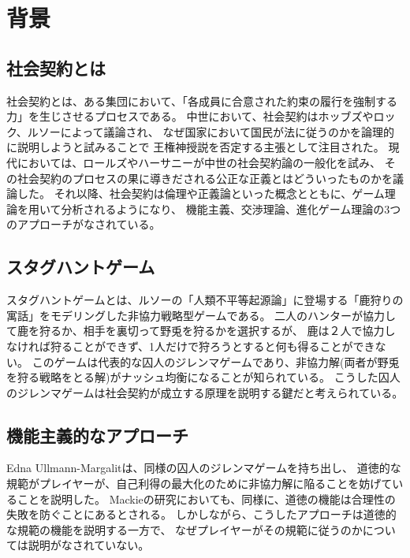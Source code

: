 

\chapter{背景}
\section{社会契約とは}
社会契約とは、ある集団において、「各成員に合意された約束の履行を強制する力」を生じさせるプロセスである。
中世において、社会契約はホッブズやロック、ルソーによって議論され、
なぜ国家において国民が法に従うのかを論理的に説明しようと試みることで
王権神授説を否定する主張として注目された。
現代においては、ロールズやハーサニーが中世の社会契約論の一般化を試み、
その社会契約のプロセスの果に導きだされる公正な正義とはどういったものかを議論した。
それ以降、社会契約は倫理や正義論といった概念とともに、ゲーム理論を用いて分析されるようになり、
機能主義、交渉理論、進化ゲーム理論の3つのアプローチがなされている。\cite{sep-game-ethics}

\section{スタグハントゲーム}

スタグハントゲームとは、ルソーの「人類不平等起源論」\cite{rousseau1999discourse}に登場する「鹿狩りの寓話」をモデリングした非協力戦略型ゲームである。\cite{skyrms2001}
二人のハンターが協力して鹿を狩るか、相手を裏切って野兎を狩るかを選択するが、
鹿は２人で協力しなければ狩ることができず、1人だけで狩ろうとすると何も得ることができない。
このゲームは代表的な囚人のジレンマゲームであり、非協力解(両者が野兎を狩る戦略をとる解)がナッシュ均衡になることが知られている。
こうした囚人のジレンマゲームは社会契約が成立する原理を説明する鍵だと考えられている。\cite{skyrms2001}

\section{機能主義的なアプローチ}
Edna Ullmann-Margalitは、同様の囚人のジレンマゲームを持ち出し、
道徳的な規範がプレイヤーが、自己利得の最大化のために非協力解に陥ることを妨げていることを説明した。\cite{edna1977emergence}
Mackieの研究においても、同様に、道徳の機能は合理性の失敗を防ぐことにあるとされる。\cite{machie1977ethics}
しかしながら、こうしたアプローチは道徳的な規範の機能を説明する一方で、
なぜプレイヤーがその規範に従うのかについては説明がなされていない。

